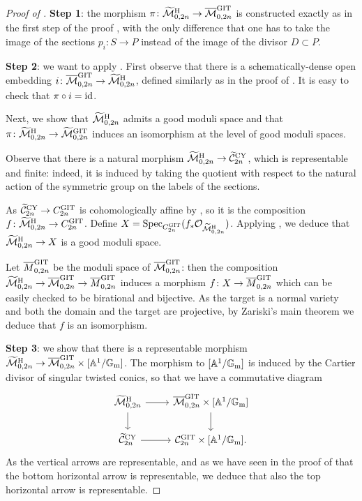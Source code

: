 \documentclass{amsart}
\newcommand{\bA}{\mathbb{A}}
\newcommand{\bG}{\mathbb{G}}
\newcommand{\cC}{\mathcal{C}}
\newcommand{\cO}{\mathcal{O}}
\newcommand{\spec}{\operatorname{Spec}}
\newcommand{\Gm}{\bG_{{\rm m}}}
\newcommand{\id}{\rm{id}}
\newcommand{\Mbar}{\overline{\mathcal{M}}}
\newcommand{\Mtilde}{\widetilde{\mathcal{M}}}
\newcommand{\Ctilde}{\widetilde{\mathcal{C}}}
\newcommand{\Hass}{{\rm H}}
\newcommand{\git}{{\rm GIT}}
\newcommand{\CY}{{\rm CY}}
\theoremstyle{definition}
\theoremstyle{definition}
\begin{document}
{\begin{proof}[Proof of ]
    \noindent
    \textbf{Step 1}: the morphism $\pi\colon \Mtilde^{\Hass}_{0,2n}\to\Mbar^{\git}_{0,2n}$ is constructed exactly as in the first step of the proof , with the only difference that one has to take the image of the sections $p_i\colon S\to P$ instead of the image of the divisor $D\subset P$.     
    
    \noindent
    \textbf{Step 2}: we want to apply . First observe that there is a schematically-dense open embedding $i\colon \Mbar^{\git}_{0,2n}\to \Mtilde^{\Hass}_{0,2n}$, defined similarly as in the proof of . It is easy to check that $\pi\circ i = \id$.
    
    Next, we show that $\Mtilde_{0,2n}^{\Hass}$ admits a good moduli space and that $\pi\colon\Mtilde_{0,2n}^{\Hass}\to\Mtilde^{\git}_{0,2n}$ induces an isomorphism at the level of good moduli spaces.

    Observe that there is a natural morphism $\Mtilde^{\Hass}_{0,2n} \to \Ctilde^{\CY}_{2n}$, which is representable and finite: indeed, it is induced by taking the quotient with respect to the natural action of the symmetric group on the labels of the sections.

    As $\Ctilde^{\CY}_{2n} \to C^{\git}_{2n}$ is cohomologically affine by , so it is the composition $f\colon \Mtilde^{\Hass}_{0,2n} \to C^{\git}_{2n}$. Define $X={\spec}_{C^{\git}_{2n}}(f_*\cO_{\Mtilde^{\Hass}_{0,2n}})$. Applying , we deduce that $\Mtilde^{\Hass}_{0,2n} \to X$ is a good moduli space.

    Let $\overline{M}_{0,2n}^{\git}$ be the moduli space of $\Mbar^{\git}_{0,2n}$: then the composition $\Mtilde^{\Hass}_{0,2n} \to \Mbar^{\git}_{0,2n} \to \overline{M}_{0,2n}^{\git}$ induces a morphism $f\colon X \to \overline{M}_{0,2n}^{\git}$ which can be easily checked to be birational and bijective. As the target is a normal variety and both the domain and the target are projective, by Zariski's main theorem we deduce that $f$ is an isomorphism.

    \noindent
    \textbf{Step 3}: we show that there is a representable morphism $\Mtilde^{\Hass}_{0,2n} \to \Mbar^{\git}_{0,2n}\times [\bA^1/\Gm]$. The morphism to $[\bA^1/\Gm]$ is induced by the Cartier divisor of singular twisted conics, so that we have a commutative diagram
    \[
    \begin{tikzcd}
        \Mtilde^{\Hass}_{0,2n} \ar[r] \ar[d] & \Mbar^{\git}_{0,2n}\times [\bA^1/\Gm] \ar[d]\\
        \Ctilde^{\CY}_{2n} \ar[r] & \cC^{\git}_{2n}\times [\bA^1/\Gm].
    \end{tikzcd}
    \]
    As the vertical arrows are representable, and as we have seen in the proof of  that the bottom horizontal arrow is representable, we deduce that also the top horizontal arrow is representable.


\end{proof}}
\end{document}
